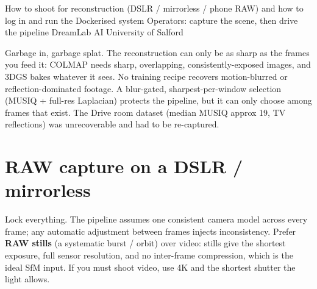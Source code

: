 \documentclass[a4paper,11pt]{article}
\begin{document}
%
{How to shoot for reconstruction (DSLR / mirrorless / phone RAW) and how to log in and run the Dockerised system}%
{Operators: capture the scene, then drive the pipeline \textperiodcentered{} DreamLab AI \textperiodcentered{} University of Salford}

\begin{keyfinding}
Garbage in, garbage splat. The reconstruction can only be as sharp as the frames you feed it:
COLMAP needs sharp, overlapping, consistently-exposed images, and 3DGS bakes whatever it sees.
No training recipe recovers motion-blurred or reflection-dominated footage. A blur-gated,
sharpest-per-window selection (MUSIQ + full-res Laplacian) protects the pipeline, but it can
only choose among frames that exist. The Drive room dataset (median MUSIQ approx 19, TV
reflections) was unrecoverable and had to be re-captured.
\end{keyfinding}

\section{RAW capture on a DSLR / mirrorless}

Lock everything. The pipeline assumes one consistent camera model across every frame; any automatic
adjustment between frames injects inconsistency. Prefer \textbf{RAW stills} (a systematic burst /
orbit) over video: stills give the shortest exposure, full sensor resolution, and no inter-frame
compression, which is the ideal SfM input. If you must shoot video, use 4K and the shortest shutter
the light allows.
\end{document}

